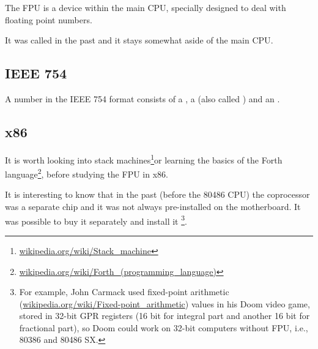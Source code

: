 \section{\FPUChapterName}
\label{sec:FPU}

\newcommand{\FNURLSTACK}{\footnote{\href{http://go.yurichev.com/17123}{wikipedia.org/wiki/Stack\_machine}}}
\newcommand{\FNURLFORTH}{\footnote{\href{http://go.yurichev.com/17124}{wikipedia.org/wiki/Forth\_(programming\_language)}}}
\newcommand{\FNURLIEEE}{\footnote{\href{http://go.yurichev.com/17125}{wikipedia.org/wiki/IEEE\_floating\_point}}}
\newcommand{\FNURLSP}{\footnote{\href{http://go.yurichev.com/17126}{wikipedia.org/wiki/Single-precision\_floating-point\_format}}}
\newcommand{\FNURLDP}{\footnote{\href{http://go.yurichev.com/17127}{wikipedia.org/wiki/Double-precision\_floating-point\_format}}}
\newcommand{\FNURLEP}{\footnote{\href{http://go.yurichev.com/17128}{wikipedia.org/wiki/Extended\_precision}}}

The \ac{FPU} is a device within the main \ac{CPU}, specially designed to deal with floating point numbers.

It was called  in the past and it stays somewhat aside of the main \ac{CPU}.

\subsection{IEEE 754}

A number in the IEEE 754 format consists of a , a  (also called ) and an .

\subsection{x86}

It is worth looking into stack machines\FNURLSTACK or learning the basics of the Forth language\FNURLFORTH,
before studying the \ac{FPU} in x86.

It is interesting to know that in the past (before the 80486 CPU) the coprocessor was a separate chip 
and it was not always pre-installed on the motherboard. It was possible to buy it separately and install it
\footnote{For example, John Carmack used fixed-point arithmetic 
(\href{http://go.yurichev.com/17356}{wikipedia.org/wiki/Fixed-point\_arithmetic}) values in his Doom video game, stored in 
32-bit \ac{GPR} registers (16 bit for integral part and another 16 bit for fractional part), so Doom
could work on 32-bit computers without FPU, i.e., 80386 and 80486 SX.}.

